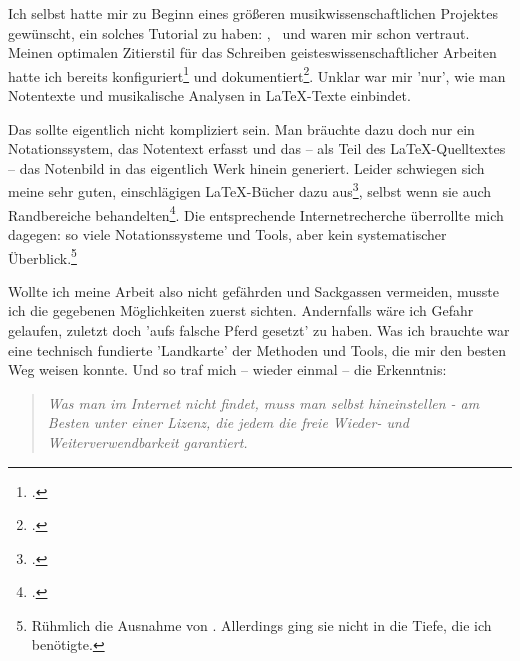 

%
%

Ich selbst hatte mir zu Beginn eines größeren musikwissenschaftlichen Projektes gewünscht, ein solches Tutorial zu haben: \acc{\LaTeX}, \ und  waren mir schon vertraut. Meinen optimalen Zitierstil für das Schreiben geisteswissenschaftlicher Arbeiten hatte ich bereits konfiguriert\footcite[vgl.][\nopage wp.]{Reincke2018a} und dokumentiert\footcite[vgl][2ff]{Reincke2018b}. Unklar war mir 'nur', wie man Notentexte und musikalische Analysen in \LaTeX-Texte einbindet.

Das sollte eigentlich nicht kompliziert sein. Man bräuchte dazu doch nur ein No\-ta\-tions\-system, das Notentext erfasst und das -- als Teil des \LaTeX-Quelltextes -- das Notenbild in das eigentlich Werk hinein generiert. Leider schwiegen sich meine sehr guten, einschlägigen \LaTeX-Bücher dazu aus\footcite[vgl.][vi ff, insbesondere 905 u. 909: das umfangreiche Register erwähnt weder Musik im allgemeinen noch LilyPond oder MusiX\TeX\ im Besonderen]{Voss2012a}, selbst wenn sie auch Randbereiche behandelten\footcite[vgl.][vii ff, insbesondere 1080 u. 1087: auch dieses umfangreiche Register erwähnt weder Musik im allgemeinen noch LilyPond oder MusiX\TeX\ im Besonderen.]{MitGoo2005a}. Die entsprechende Internetrecherche überrollte mich dagegen: so viele Notationssysteme und Tools, aber kein systematischer Überblick.\footnote{Rühmlich die Ausnahme von \cite[][\nopage wp.]{Thoma2018a}. Allerdings ging sie nicht in die Tiefe, die ich benötigte.}

Wollte ich meine Arbeit also nicht gefährden und Sackgassen vermeiden, musste ich die gegebenen Möglichkeiten zuerst sichten. Andernfalls wäre ich Gefahr gelaufen, zuletzt doch 'aufs falsche Pferd gesetzt' zu haben. Was ich brauchte war eine technisch fundierte 'Landkarte' der Methoden und Tools, die mir den besten Weg weisen konnte. Und so traf mich -- wieder einmal -- die Erkenntnis:

\begin{quote}\textit{Was man im Internet nicht findet, muss man selbst hineinstellen - am Besten unter einer Lizenz, die jedem die freie Wieder- und Weiterverwendbarkeit garantiert.} \end{quote}

%
